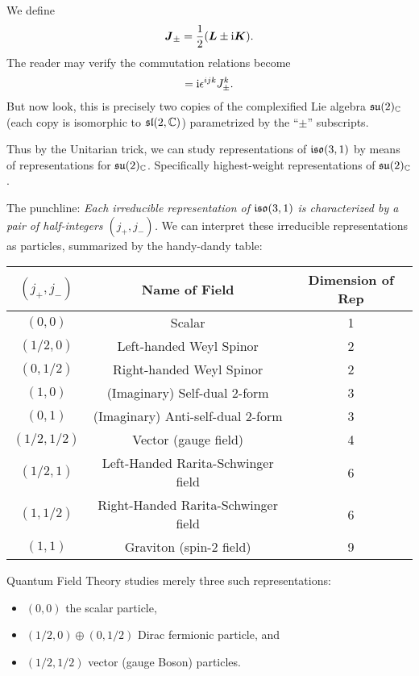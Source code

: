 We define
\begin{equation}
\boldsymbol{J}_{\pm} = \frac{1}{2}(\boldsymbol{L}\pm\mathrm{i}\boldsymbol{K}).
\end{equation}
The reader may verify the commutation relations become
\begin{equation}
[J^{i}_{\pm}, J^{j}_{\pm}] = \I\epsilon^{ijk}J^{k}_{\pm}.
\end{equation}
But now look, this is precisely two copies of the complexified Lie
algebra $\mathfrak{su}(2)_{\mathbb{C}}$ (each copy is isomorphic to $\mathfrak{sl}(2,\mathbb{C})$)
parametrized by the ``$\pm$'' subscripts.

Thus by the Unitarian trick, we can study representations of $\mathfrak{iso}(3,1)$
by means of representations for $\mathfrak{su}(2)_{\mathbb{C}}$. Specifically
highest-weight representations of $\mathfrak{su}(2)_{\mathbb{C}}$.

\M\label{chunk:rqm:poincare-algebra:elementary-particles-irreps}
The punchline:
\textit{Each irreducible representation of $\mathfrak{iso}(3,1)$
is characterized by a pair of half-integers $(j_{+}, j_{-})$.} We can
interpret these irreducible representations as particles, summarized by
the handy-dandy table:

\begin{center}
\begin{tabular}{c|c|c}
  $(j_{+}, j_{-})$ & Name of Field & Dimension of Rep \\\hline
  $(0, 0)$ &	Scalar  &	1\\
$(1/2, 0)$ & 	Left-handed Weyl Spinor &	2\\
$(0, 1/2)$ &	Right-handed Weyl Spinor &	2\\
$(1, 0)$ &	(Imaginary) Self-dual 2-form &	3\\
$(0, 1)$ &	(Imaginary) Anti-self-dual 2-form &	3\\
$(1/2, 1/2)$ &	Vector (gauge field) &	4\\
$(1/2, 1)$ & 	Left-Handed Rarita-Schwinger field &	6\\
$(1, 1/2)$ &	Right-Handed Rarita-Schwinger field &	6\\
$(1, 1)$ &	Graviton (spin-2 field) &	9
\end{tabular}
\end{center}

Quantum Field Theory studies merely three such representations:
\begin{itemize}
\item $(0,0)$ the scalar particle,
\item $(1/2,0)\oplus(0,1/2)$ Dirac fermionic particle, and
\item $(1/2, 1/2)$ vector (gauge Boson) particles.
\end{itemize}

